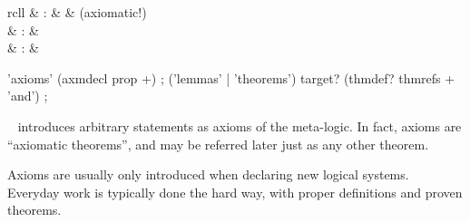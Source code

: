 \begin{isabellebody}
\begin{isamarkuptext}
\begin{description}
  \end{description}%
\end{isamarkuptext}%
\isamarkuptrue%
%
\isamarkuptrue%
%
\begin{isamarkuptext}%
\begin{matharray}{rcll}
    \hypertarget{command.axioms}{\hyperlink{command.axioms}{\mbox{}}} & : &  & (axiomatic!) \\
    \hypertarget{command.lemmas}{\hyperlink{command.lemmas}{\mbox{}}} & : &  \\
    \hypertarget{command.theorems}{\hyperlink{command.theorems}{\mbox{}}} & : &  \\
  \end{matharray}

  \begin{rail}
    'axioms' (axmdecl prop +)
    ;
    ('lemmas' | 'theorems') target? (thmdef? thmrefs + 'and')
    ;
  \end{rail}

  \begin{description}
  
  \item \hyperlink{command.axioms}{\mbox{}}~ introduces arbitrary
  statements as axioms of the meta-logic.  In fact, axioms are
  ``axiomatic theorems'', and may be referred later just as any other
  theorem.
  
  Axioms are usually only introduced when declaring new logical
  systems.  Everyday work is typically done the hard way, with proper
  definitions and proven theorems.
  

\end{description}
\end{isamarkuptext}
\end{isabellebody}
